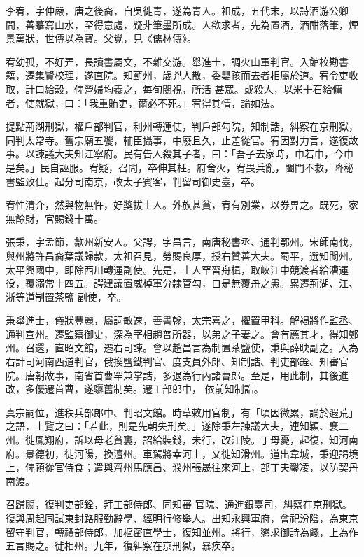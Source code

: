 \begin{pinyinscope}
 李宥，字仲嚴，唐之後裔，自吳徙青，遂為青人。祖成，五代末，以詩酒游公卿間，善摹寫山水，至得意處，疑非筆墨所成。人欲求者，先為置酒，酒酣落筆，煙景萬狀，世傳以為寶。父覺，見《儒林傳》。



 宥幼孤，不好弄，長讀書屬文，不雜交游。舉進士，調火山軍判官。入館校勘書籍，遷集賢校理，遂直院。知蘄州，歲兇人散，委嬰孩而去者相屬於道。宥令吏收取，計口給穀，俾營婦均養之，每旬閱視，所活
 甚眾。或殺人，以米十石給傭者，使就獄，曰：「我重賄吏，爾必不死。」宥得其情，論如法。



 提點荊湖刑獄，權戶部判官，利州轉運使，判戶部勾院，知制誥，糾察在京刑獄，同判太常寺。舊宗廟五饗，輔臣攝事，中廢且久，止差從官。宥因對力言，遂復故事。以諫議大夫知江寧府。民有告人殺其子者，曰：「吾子去家時，巾若巾，今巾是矣。」民自誣服。宥疑，召問，卒伸其枉。府舍火，宥畏兵亂，闔門不救，降秘書監致仕。起分司南京，改太子賓客，判留司御史臺，卒。



 宥性清介，然與物無忤，好獎拔士人。外族甚貧，宥有別業，以券畀之。既死，家無餘財，官賜錢十萬。



 張秉，字孟節，歙州新安人。父諤，字昌言，南唐秘書丞、通判鄂州。宋師南伐，與州將許昌裔葉議歸款，太祖召見，勞賜良厚，授右贊善大夫。蜀平，選知閬州。太平興國中，即除西川轉運副使。先是，土人罕習舟楫，取峽江中競渡者給漕運役，覆溺常十四五。諤建議置威棹軍分隸管勾，自是無覆舟之患。累遷荊湖、江、浙等道制置茶鹽
 副使，卒。



 秉舉進士，儀狀豐麗，屬詞敏速，善書翰，太宗喜之，擢置甲科。解褐將作監丞、通判宣州。遷監察御史，深為宰相趙普所器，以弟之子妻之。會有薦其才，得知鄭州。召還，直昭文館，遷右司諫。會以趙昌言為制置茶鹽使，秉與薛映副之。入為右計司河南西道判官，俄換鹽鐵判官、度支員外郎、知制誥、判吏部銓、知審官院。唐朝故事，南省首曹罕兼掌誥，多退為行內諸曹郎。至是，用此制，其後進改，多優遷首曹，遂隳舊制矣。遷工部郎中，
 依前知制誥。



 真宗嗣位，進秩兵部郎中、判昭文館。時草敕用官制，有「頃因微累，謫於遐荒」之語，上覽之曰：「若此，則是先朝失刑矣。」遂除秉左諫議大夫，連知穎、襄二州。徙鳳翔府，訴以母老貧窶，詔給裝錢，未行，改江陵。丁母憂，起復，知河南府。景德初，徙河陽，換澶州。車駕將幸河上，又徙知滑州。道出韋城，秉迎謁境上，俾預從官侍食；遣與齊州馬應昌、濮州張晟往來河上，部丁夫鑿凌，以防契丹南渡。



 召歸闕，復判吏部銓，拜工部侍郎、同知審
 官院、通進銀臺司，糾察在京刑獄。復與周起同試東封路服勤辭學、經明行修舉人。出知永興軍府，會祀汾陰，為東京留守判官，轉禮部侍郎，加樞密直學士，復知並州。將行，懇求御詩為餞，上為作五言賜之。徙相州。九年，復糾察在京刑獄，暴疾卒。




\end{pinyinscope}
